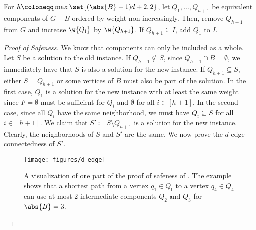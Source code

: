\begin{lemma}
\begin{lemma}
\begin{lemma}
\begin{lemma}
\begin{lemma}
\begin{theorem}
\begin{reduction*}
\begin{lemma}
\begin{reduction*}
\iflong
\begin{reduction*}
\else
\begin{reduction*}[$\star$]
\fi
\label{red:d_edge_many_twins}
  For $h \coloneqq \max\set{(\abs{B}-1)d + 2, 2}$, let $Q_1, \ldots, Q_{h+1}$ be equivalent components of $G-B$ ordered by weight non-increasingly. Then, remove $Q_{h+1}$ from $G$ and increase $\w{Q_1}$ by $\w{Q_{h+1}}$. If $Q_{h+1} \subseteq I$, add $Q_1$ to $I$.
\end{reduction*}
\iflong
\begin{proof}[Proof of Safeness]
  We know that components can only be included as a whole. Let $S$ be a solution to the old instance.
  If $Q_{h+1} \not\subseteq S$, since $Q_{h+1} \cap B = \emptyset$, we immediately have that $S$ is also a solution for the new instance.
  If $Q_{h+1} \subseteq S$, either $S = Q_{h+1}$ or some vertices of $B$ must also be part of the solution. In the first case, $Q_1$ is a solution for the new instance with at least the same weight since $F = \emptyset$ must be sufficient for $Q_i$ and $\emptyset$ for all $i \in [h+1]$.
  In the second case, since all $Q_i$ have the same neighborhood, we must have $Q_i \subseteq S$ for all $i \in [h+1]$. We claim that $S' \coloneqq S \setminus Q_{h+1}$ is a solution for the new instance. Clearly, the neighborhoods of $S$ and $S'$ are the same. We now prove the $d$-edge-connectedness of $S'$.

\begin{figure}[t]
  \centering
  \texttt{[image: figures/d\_edge]}
\caption{A visualization of one part of the proof of safeness of . The example shows that a shortest path from a vertex $q_1 \in Q_1$ to a vertex $q_4 \in Q_4$ can use at most $2$ intermediate components $Q_2$ and $Q_3$ for $\abs{B} = 3$.}
  \label{fig:many_twins}
\end{figure}


\end{proof}
\end{reduction*}
\end{reduction*}
\end{lemma}
\end{reduction*}
\end{theorem}
\end{lemma}
\end{lemma}
\end{lemma}
\end{lemma}
\end{lemma}
